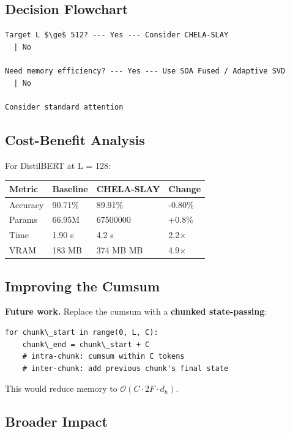 \subsection{Decision Flowchart}

\begin{lstlisting}
Target L $\ge$ 512? --- Yes --- Consider CHELA-SLAY
  | No
   
Need memory efficiency? --- Yes --- Use SOA Fused / Adaptive SVD
  | No
   
Consider standard attention
\end{lstlisting}

\subsection{Cost-Benefit Analysis}

For DistilBERT at L = 128:

\begin{table}[H]
\centering
\small
\begin{tabular}{llll}
\toprule
\textbf{Metric} & \textbf{Baseline} & \textbf{CHELA-SLAY} & \textbf{Change} \\
\midrule
Accuracy & 90.71\% & 89.91\% & -0.80\% \\
Params & 66.95M & 67500000 & +0.8\% \\
Time & 1.90 s & 4.2 s & 2.2$\times$ \\
VRAM & 183 MB & 374 MB MB & 4.9$\times$ \\
\bottomrule
\end{tabular}
\end{table}

\subsection{Improving the Cumsum}

\textbf{Future work.} Replace the cumsum with a \textbf{chunked state-passing}:

\begin{lstlisting}
for chunk\_start in range(0, L, C):
    chunk\_end = chunk\_start + C
    # intra-chunk: cumsum within C tokens
    # inter-chunk: add previous chunk's final state
\end{lstlisting}

This would reduce memory to $\mathcal{O}(C \cdot 2F \cdot d_h)$.

\subsection{Broader Impact}

